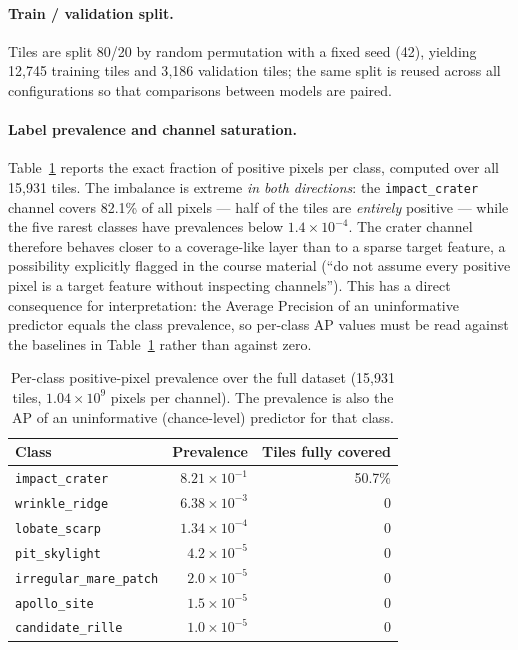 \paragraph{Train / validation split.}
Tiles are split 80/20 by random permutation with a fixed seed (42), yielding 12{,}745 training tiles and 3{,}186 validation tiles; the same split is reused across all configurations so that comparisons between models are paired.

\paragraph{Label prevalence and channel saturation.}
Table~\ref{tab:prevalence} reports the exact fraction of positive pixels per class, computed over all 15{,}931 tiles. The imbalance is extreme \emph{in both directions}: the \texttt{impact\_crater} channel covers 82.1\% of all pixels — half of the tiles are \emph{entirely} positive — while the five rarest classes have prevalences below $1.4\times10^{-4}$. The crater channel therefore behaves closer to a coverage-like layer than to a sparse target feature, a possibility explicitly flagged in the course material (``do not assume every positive pixel is a target feature without inspecting channels''). This has a direct consequence for interpretation: the Average Precision of an uninformative predictor equals the class prevalence, so per-class AP values must be read against the baselines in Table~\ref{tab:prevalence} rather than against zero.

\begin{table}[h]
\centering
\caption{Per-class positive-pixel prevalence over the full dataset (15{,}931 tiles, $1.04\times10^9$ pixels per channel). The prevalence is also the AP of an uninformative (chance-level) predictor for that class.}
\label{tab:prevalence}
\begin{tabular}{lrr}
\toprule
Class & Prevalence & Tiles fully covered \\
\midrule
\texttt{impact\_crater}        & $8.21\times10^{-1}$ & 50.7\% \\
\texttt{wrinkle\_ridge}        & $6.38\times10^{-3}$ & 0 \\
\texttt{lobate\_scarp}         & $1.34\times10^{-4}$ & 0 \\
\texttt{pit\_skylight}         & $4.2\times10^{-5}$  & 0 \\
\texttt{irregular\_mare\_patch} & $2.0\times10^{-5}$  & 0 \\
\texttt{apollo\_site}          & $1.5\times10^{-5}$  & 0 \\
\texttt{candidate\_rille}      & $1.0\times10^{-5}$  & 0 \\
\bottomrule
\end{tabular}
\end{table}

